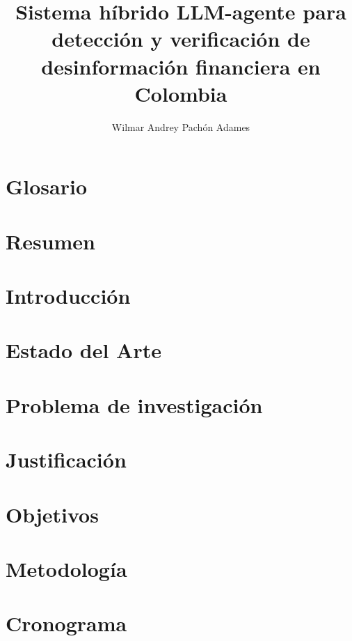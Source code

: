 \documentclass[12pt]{MIA-USA}
\title{Sistema h\'ibrido LLM-agente para detecci\'on y verificaci\'on de desinformaci\'on financiera en Colombia}
\author{Wilmar Andrey Pach\'on Adames}
\begin{document}
	\maketitle

    \tableofcontents
    \listoffigures
    \listoftables

    \chapter*{Glosario}
 	

	\chapter*{Resumen}
 	

    \chapter{Introducci\'on}
    

    \chapter{Estado del Arte}
    

    \chapter{Problema de investigaci\'on}
    

    \chapter{Justificaci\'on}
    

    \chapter{Objetivos}
    

    \chapter{Metodolog\'ia}
    

    \chapter{Cronograma}
    
\end{document}
